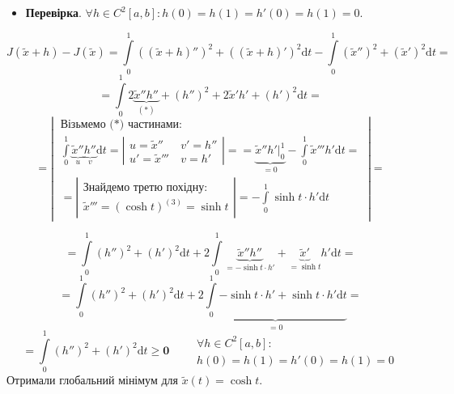 \documentclass{beamer}
\begin{document}
\begin{frame}
\begin{itemize}
  \item \textbf{Перевірка}. $\forall h \in C^2 [a,b] : h(0) = h(1) = h'(0) = h(1) = 0$.
\end{itemize}
$$
J(\tilde{x} + h) - J(\tilde{x}) =  \int\limits_{0}^{1}{ ((\tilde{x} + h)'')^2 + ((\tilde{x} + h)')^2 \mathrm{d} t} -  \int\limits_{0}^{ 1}{
(\tilde{x}'')^2 + (\tilde{x}')^2 \mathrm{d} t =
}
$$
$$
=  \int\limits_{0}^{1}{
2 \underbrace{\tilde{x}'' h''}_{(*)} + ( h'' )^2 + 2 \tilde{x}' h' + (h')^2 \mathrm{d} t
 } =
$$
$$
=
\left| \
\begin{gathered}
\text{Візьмемо ($*$) частинами:}\\
 \int\limits_{0}^{1}{\underbrace{\tilde{x}''}_{u} \underbrace{h''}_{v} \mathrm{d} t}  = \left| \begin{gathered}
  u =  \tilde{x}'' \\
  u' =  \tilde{x}'''
 \end{gathered} \
\begin{gathered}
 v' = h''\\
 v = h'
\end{gathered}\right| =
= \underbrace{\tilde{x}'' h' \bigg|_{0}^{1}}_{=0} -  \int\limits_{0}^{1}{ \tilde{x}''' h' \mathrm{d} t} = \\
= \left| \begin{gathered}
 \text{Знайдемо третю похідну:}\\
 \tilde{x}''' = (\cosh t)^{(3)}  = \sinh t
\end{gathered} \right| = -  \int\limits_{0}^{1}{ \sinh t \cdot h' \mathrm{d} t}
\end{gathered}
   \  \right|=
$$
\end{frame}
\begin{frame}
   $$= \int\limits_{0}^{1}{ (h'')^2 + (h')^2 \mathrm{d} t } + 2  \int\limits_{0}^{1}{ \underbrace{\tilde{x}'' h''}_{=-\sinh t \cdot h'} + \underbrace{\tilde{x}'}_{= \sinh t} h' \mathrm{d} t} = $$
   $$
   = \int\limits_{0}^{1}{ (h'')^2 + (h')^2 \mathrm{d} t } + 2  \underbrace{\int\limits_{0}^{1}{ - \sinh t \cdot h' + \sinh t \cdot h' \mathrm{d} t}}_{=0} =
   $$
   $$ = \int\limits_{0}^{1}{ (h'')^2 + (h')^2 \mathrm{d} t }  \mathbf{\geq 0} \qquad
\begin{gathered}
  \forall h \in C^2 [a,b] :\\
  h(0) = h(1) = h'(0) = h(1) = 0
\end{gathered}
   $$
   Отримали \alert{глобальний мінімум} для $\tilde{x} (t) = \cosh t  $.
\end{frame}
\end{document}
